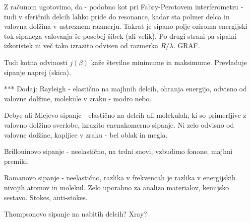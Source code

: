 Z računom ugotovimo, da - podobno kot pri Fabry-Perotovem interferometru - tudi v sferičnih delcih
lahko pride do resonance, kadar sta polmer delca in valovna dolžina v ustreznem razmerju. Takrat 
je sipano polje oziroma energijski tok sipanega valovanja še posebej šibek (ali velik). Po drugi
strani  pa sipalni izkoristek ni več tako izrazito odvisen od razmerka $R/\lambda$. GRAF. 

Tudi kotna odvinosti $j(\beta)$ kaže številne minimume in maksimume. Prevladuje sipanje naprej (skica).

***
Dodaj: Rayleigh - elastično na majhnih delcih, ohranja energijo, 
odvisno od valovne dolžine, molekule v zraku - modro nebo.

Debye ali Miejevo sipanje - elastično na delcih ali molekulah, ki so primerljive
z valovno dolžino sverlobe, izrazito enenakomerno sipanje. Ni zelo odvisno od
valovne dolžine, kapljice v zraku - bel oblak in megla. 

Brillouinovo sipanje - neelastično, na trdni snovi, vzbudimo fonone, majhni premiki.

Ramanovo sipanje - neelastično, razlika v frekvencah je razlika v energijskih 
nivojih atomov in molekul. Zelo uporabno za analizo materialov, kemijsko sestavo.
Stokes, anti-stokes. 

Thompsonovo sipanje na nabitih delcih? Xray?
